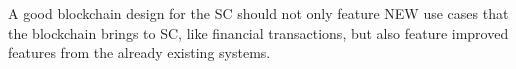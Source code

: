A good blockchain design for the SC should not only feature NEW use cases that the blockchain brings to SC, like financial transactions, but also feature improved features from the already existing systems.












